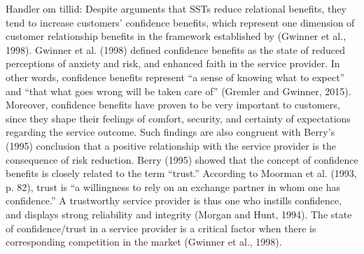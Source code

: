 Handler om tillid: Despite arguments that SSTs reduce relational benefits, they tend to increase customers' confidence benefits, which represent one dimension of customer relationship benefits in the framework established by (Gwinner et al., 1998). Gwinner et al. (1998) defined confidence benefits as the state of reduced perceptions of anxiety and risk, and enhanced faith in the service provider. In other words, confidence benefits represent “a sense of knowing what to expect” and “that what goes wrong will be taken care of” (Gremler and Gwinner, 2015). Moreover, confidence benefits have proven to be very important to customers, since they shape their feelings of comfort, security, and certainty of expectations regarding the service outcome. Such findings are also congruent with Berry's (1995) conclusion that a positive relationship with the service provider is the consequence of risk reduction. Berry (1995) showed that the concept of confidence benefits is closely related to the term “trust.” According to Moorman et al. (1993, p. 82), trust is “a willingness to rely on an exchange partner in whom one has confidence.” A trustworthy service provider is thus one who instills confidence, and displays strong reliability and integrity (Morgan and Hunt, 1994). The state of confidence/trust in a service provider is a critical factor when there is corresponding competition in the market (Gwinner et al., 1998). \textcite[s. 353]{PDF:TheImpactOfTraveler}